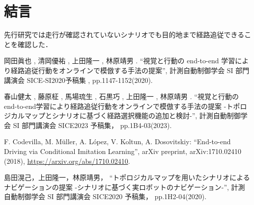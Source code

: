 \documentclass[10pt]{jarticle}
\begin{document}
    \section{結\hspace{2zw}言}%
    先行研究では走行が確認されていないシナリオでも目的地まで経路追従できることを確認した．

    \vspace{5truemm}
    {\footnotesize
        \begin{thebibliography}{99}
            
            岡田眞也 , 清岡優祐 , 上田隆一 , 林原靖男 .
            ``視覚と行動の end-to-end 学習により経路追従行動をオンラインで模倣する手法の提案'',
            計測自動制御学会 SI 部門講演会 SICE-SI2020予稿集 , 
            pp.1147-1152(2020).

            春山健太 , 藤原柾 , 馬場琉生 , 石黒巧 , 上田隆一 , 林原靖男 .
            ``視覚と行動のend-to-end学習により経路追従行動をオンラインで模倣する手法の提案 -トポロジカルマップとシナリオに基づく経路選択機能の追加と検討-'',
            計測自動制御学会 SI 部門講演会 SICE2023 予稿集，
            pp.1B4-03(2023).
       
            F. Codevilla, M. Müller, A. López, V. Koltun, A. Dosovitskiy: 
            ``End-to-end Driving via Conditional Imitation Learning'', 
            arXiv preprint, arXiv:1710.02410 (2018), 
            \url{https://arxiv.org/abs/1710.02410}.

            島田滉己，上田隆一，林原靖男，
            ``トポロジカルマップを用いたシナリオによるナビゲーションの提案 -シナリオに基づく実ロボットのナビゲーション-'',
            計測自動制御学会 SI 部門講演会 SICE2020 予稿集，
            pp.1H2-04(2020).



        \end{thebibliography}
    }
    \normalsize
    
\end{document}
